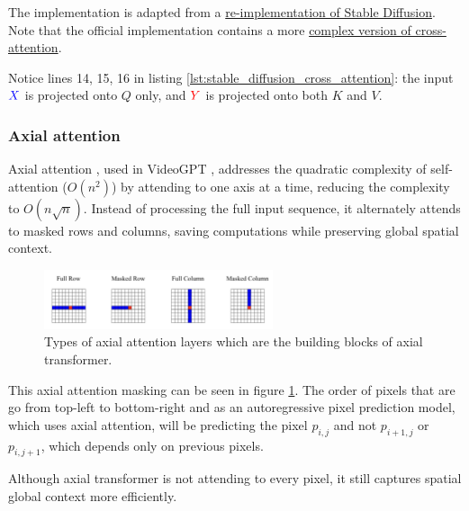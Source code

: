 The implementation is adapted from a \href{https://github.com/hkproj/pytorch-stable-diffusion/blob/e0cb06de011787cdf13eed7b4287ad8410491149/sd/attention.py#L100C1-L110C28}{re-implementation of Stable Diffusion}. Note that the official implementation contains a more \href{https://github.com/CompVis/stable-diffusion/blob/21f890f9da3cfbeaba8e2ac3c425ee9e998d5229/ldm/modules/attention.py#L152}{complex version of cross-attention}.

Notice lines 14, 15, 16 in listing \ref{lst:stable_diffusion_cross_attention}: the input $\textcolor{blue}{X}$ is projected onto $Q$ only, and $\textcolor{red}{Y}$ is projected onto both $K$ and $V$.














\subsubsection{Axial attention}

Axial attention \cite{axial_attention}, used in VideoGPT \cite{videogpt}, addresses the quadratic complexity of self-attention ($O(n^2)$) by attending to one axis at a time, reducing the complexity to $O(n\sqrt{n})$. Instead of processing the full input sequence, it alternately attends to masked rows and columns, saving computations while preserving global spatial context.

\begin{figure}
    \centering
    \includegraphics[width=0.6\textwidth]{images/appendix/attention/axial.png}
    \caption{Types of axial attention layers which are the building blocks of axial transformer.}
    \label{fig:axial_attention}
\end{figure}

This axial attention masking can be seen in figure \ref{fig:axial_attention}. The order of pixels that are go from top-left to bottom-right and as an autoregressive pixel prediction model, which uses axial attention, will be predicting the pixel $p_{i, j}$ and not $p_{i+1, j}$ or $p_{i, j+1}$, which depends only on previous pixels.

Although axial transformer is not attending to every pixel, it still captures spatial global context more efficiently.
